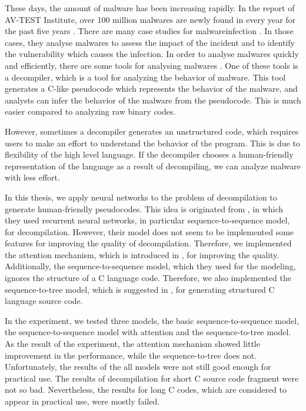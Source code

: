 \documentclass[senior,final,11pt]{iscs-thesis}
\begin{document}
These days, the amount of malware has been increasing rapidly. In the report of AV-TEST Institute,
over 100 million malwares are newly found in every year for the past five years \citep{malware_increase}.
There are many case studies for malwareinfection \citep{malware_case_1,malware_case_2,malware_case_3,malware_case_4}.
In those cases, they analyse malwares to assess the impact of the incident and to identify the vulnerability which causes the infection.
In order to analyse malwares quickly and efficiently, there are some tools for analysing malwares \citep{mal_anal_tool}.
One of these tools is a decompiler, which is a tool for analyzing the behavior of malware. 
This tool generates a C-like pseudocode which represents the behavior of the malware, and analysts can infer the behavior of the malware from the pseudocode.
This is much easier compared to analyzing raw binary codes.

However, sometimes a decompiler generates an unstructured code, which requires users to make an effort to understand the behavior of the program. 
This is due to flexibility of the high level language. If the decompiler chooses a human-friendly representation of the language as a result of decompiling, we can analyze malware with less effort. 

In this thesis, we apply neural networks to the problem of decompilation to generate human-friendly pseudocodes. 
This idea is originated from \citet{Motoneta}, in which they used recurrent neural networks, in particular sequence-to-sequence model, for decompilation.
However, their model does not seem to be implemented some features for improving the quality of decompilation.
Therefore, we implemented the attention mechanism, which is introduced in \citet{dot_attention}, for improving the quality.
Additionally, the sequence-to-sequence model, which they used for the modeling, ignores the structure of a C language code.
Therefore, we also implemented the sequence-to-tree model, which is suggested in \citet{Seq2Tree}, for generating structured C language source code.

In the experiment, we tested three models, the basic sequence-to-sequence model, the sequence-to-sequence model with attention and the sequence-to-tree model.
As the result of the experiment, the attention mechanism showed little improvement in the performance, while the sequence-to-tree does not.
Unfortunately, the results of the all models were not still good enough for practical use.
The results of decompilation for short C source code fragment were not so bad. 
Nevertheless, the results for long C codes, which are considered to appear in practical use, were mostly failed.
\end{document}
